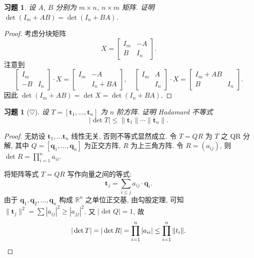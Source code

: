 \documentclass[UTF8]{ctexart}
\newtheorem{ex}[thm]{习题}
\begin{document}
\begin{ex}
  设 \(A\), \(B\) 分别为 \(m\times n\), \(n\times m\) 矩阵.
  证明 \(\det(I_m + AB) = \det(I_n+BA)\).
\end{ex}

\begin{proof}
  考虑分块矩阵
  \begin{equation*}
    X=
    \begin{bmatrix}
      I_m & -A \\ B & I_n
    \end{bmatrix}.
  \end{equation*}
  注意到
  \begin{equation*}
    \begin{bmatrix}
      I_m   \\ -B & I_n
    \end{bmatrix}
    \cdot X
    =
    \begin{bmatrix}
      I_m & -A \\ & I_n + BA
    \end{bmatrix},
    \quad
    \begin{bmatrix}
      I_m & A\\   & I_n
    \end{bmatrix}
    \cdot X
    =
    \begin{bmatrix}
      I_m+AB \\ B & I_n
    \end{bmatrix}.
  \end{equation*}
  因此 \(\det(I_m+AB)=\det X=\det(I_n+BA)\).
\end{proof}

\begin{ex}[\(\heartsuit\)]
  设 \(T = [\boldsymbol{t}_1,\ldots,\boldsymbol{t}_n]\) 为 \(n\) 阶方阵.
  证明 Hadamard 不等式
  \[
    |\det T| \leq \|\boldsymbol{t}_1\| \cdots \|\boldsymbol{t}_n\|.
  \]
\end{ex}

\begin{proof}
  无妨设 \(\boldsymbol{t}_1,\ldots\boldsymbol{t}_n\) 线性无关, 否则不等式显然成立.
  令 \(T = QR\) 为 \(T\) 之 QR 分解, 其中
  \(Q = [\boldsymbol{q}_1,\ldots,\boldsymbol{q}_n]\) 为正交方阵,
  \(R\) 为上三角方阵. 令 \(R = (a_{ij})\),
  则 \(\det R = \prod_{i=1}^{n} a_{ii}\).

  将矩阵等式 \(T=QR\)  写作向量之间的等式:
  \begin{equation*}
    \boldsymbol{t}_{j} = \sum_{i\leq j} a_{ij} \cdot \boldsymbol{q}_i.
  \end{equation*}
  由于 \(\boldsymbol{q}_1, \boldsymbol{q}_2, \ldots,\boldsymbol{q}_n\)
  构成 \(\mathbb{R}^n\) 之单位正交基,
  由勾股定理, 可知 \(\|\boldsymbol{t}_j\|^{2} = \sum |a_{ij}|^2 \geq |a_{jj}|^{2}\).
  又 \(|\det Q| = 1\), 故
  \begin{equation*}
    |\det T| = |\det R| = \prod_{i=1}^{n} |a_{ii}| \leq \prod_{i=1}^{n}\|t_i\|. \qedhere
  \end{equation*}
\end{proof}
\end{document}
